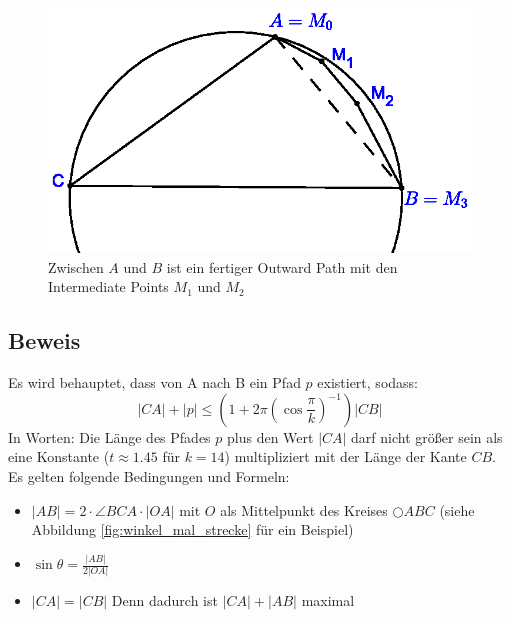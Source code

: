 \documentclass[a4paper,twoside]{IEEEtran}
\begin{document}
\begin{figure}[h!]
\centering
\includegraphics[width=1\linewidth]{outward_path_fertig.eps}
\caption{Zwischen $A $ und $B $ ist ein fertiger Outward Path mit den Intermediate Points $M_1 $ und $M_2 $}
\label{fig:outward_path_fertig}
\end{figure}

\subsection{Beweis}
Es wird behauptet, dass von A nach B ein Pfad $p $ existiert, sodass:
\begin{equation}
|CA| + |p| \leq (1+2\pi(\cos{\frac{\pi}{k}})^{-1})|CB|
\end{equation}
In Worten: Die Länge des Pfades $p $ plus den Wert $|CA| $ darf nicht größer sein als eine Konstante ($t \approx 1.45 $ für $k=14 $) multipliziert mit der Länge der Kante $CB $.
Es gelten folgende Bedingungen und Formeln:
\begin{itemize}
\item $|AB| = 2\cdot \angle{BCA} \cdot |OA| $ mit $O $ als Mittelpunkt des Kreises $\bigcirc{ABC} $ (siehe Abbildung \ref{fig:winkel_mal_strecke} für ein Beispiel)
\item $\sin{\theta}=\frac{|AB|}{2|OA|} $ %
\item $|CA|=|CB| $ Denn dadurch ist $|CA| + |AB| $ maximal%
\end{itemize}
\end{document}
